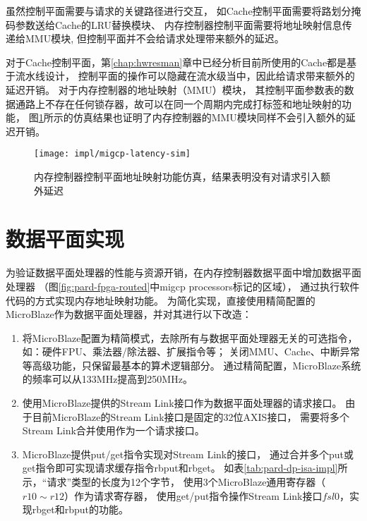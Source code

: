虽然控制平面需要与请求的关键路径进行交互，
如Cache控制平面需要将路划分掩码参数送给Cache的LRU替换模块、
内存控制器控制平面需要将地址映射信息传递给MMU模块,
但控制平面并不会给请求处理带来额外的延迟。

对于Cache控制平面，第\ref{chap:hwresman}章中已经分析目前所使用的Cache都是基于流水线设计，
控制平面的操作可以隐藏在流水级当中，因此给请求带来额外的延迟开销。
对于内存控制器的地址映射（MMU）模块，
其控制平面参数表的数据通路上不存在任何锁存器，故可以在同一个周期内完成打标签和地址映射的功能，
图\ref{fig:migcp-latency-sim}所示的仿真结果也证明了内存控制器的MMU模块同样不会引入额外的延迟开销。

\begin{figure}[htb]
  \centering
  \texttt{[image: impl/migcp-latency-sim]}
  \caption[内存控制器控制平面地址映射功能仿真]{内存控制器控制平面地址映射功能仿真，结果表明没有对请求引入额外延迟}
  \label{fig:migcp-latency-sim}
\end{figure}


\section{数据平面实现}

为验证数据平面处理器的性能与资源开销，在内存控制器数据平面中增加数据平面处理器
（图\ref{fig:pard-fpga-routed}中migcp processors标记的区域），
通过执行软件代码的方式实现内存地址映射功能。
为简化实现，直接使用精简配置的MicroBlaze作为数据平面处理器，并对其进行以下改造：

\begin{enumerate}[leftmargin=2\parindent, nolistsep, label=\arabic*）]
  \item 将MicroBlaze配置为精简模式，去除所有与数据平面处理器无关的可选指令，
        如：硬件FPU、乘法器/除法器、扩展指令等；
        关闭MMU、Cache、中断异常等高级功能，只保留最基本的算术逻辑部分。
        通过精简配置，MicroBlaze系统的频率可以从133MHz提高到250MHz。
  \item 使用MicroBlaze提供的Stream Link接口作为数据平面处理器的请求接口。
        由于目前MicroBlaze的Stream Link接口是固定的32位AXIS接口，
        需要将多个Stream Link合并使用作为一个请求接口。
  \item MicroBlaze提供put/get指令实现对Stream Link的接口，
        通过合并多个put或get指令即可实现请求缓存指令rbput和rbget。
        如表\ref{tab:pard-dp-isa-impl}所示，``请求''类型的长度为12个字节，
        使用3个MicroBlaze通用寄存器（$r10\sim r12$）作为请求寄存器，
        使用get/put指令操作Stream Link接口$fsl0$，实现rbget和rbput的功能。
\end{enumerate}

